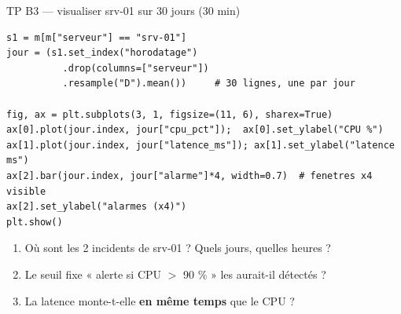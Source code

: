 \begin{frame}[fragile]{TP B3 --- visualiser srv-01 sur 30 jours (30 min)}
\begin{codebox}
\begin{lstlisting}
s1 = m[m["serveur"] == "srv-01"]
jour = (s1.set_index("horodatage")
          .drop(columns=["serveur"])
          .resample("D").mean())     # 30 lignes, une par jour

fig, ax = plt.subplots(3, 1, figsize=(11, 6), sharex=True)
ax[0].plot(jour.index, jour["cpu_pct"]);  ax[0].set_ylabel("CPU %")
ax[1].plot(jour.index, jour["latence_ms"]); ax[1].set_ylabel("latence ms")
ax[2].bar(jour.index, jour["alarme"]*4, width=0.7)  # fenetres x4 visible
ax[2].set_ylabel("alarmes (x4)")
plt.show()
\end{lstlisting}
\end{codebox}
\begin{abox}
\begin{enumerate}
\item Où sont les 2 incidents de srv-01 ? Quels jours, quelles heures ?
\item Le seuil fixe « alerte si CPU $>$ 90 \% » les aurait-il détectés ?
\item La latence monte-t-elle \textbf{en même temps} que le CPU ?
\end{enumerate}
\end{abox}
\end{frame}

